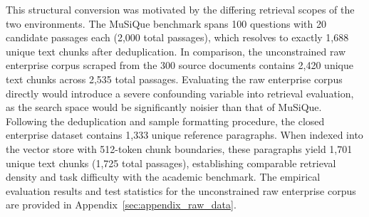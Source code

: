This structural conversion was motivated by the differing retrieval scopes of the two environments. The MuSiQue benchmark spans 100 questions with 20 candidate passages each (2,000 total passages), which resolves to exactly 1,688 unique text chunks after deduplication. In comparison, the unconstrained raw enterprise corpus scraped from the 300 source documents contains 2,420 unique text chunks across 2,535 total passages. Evaluating the raw enterprise corpus directly would introduce a severe confounding variable into retrieval evaluation, as the search space would be significantly noisier than that of MuSiQue. Following the deduplication and sample formatting procedure, the closed enterprise dataset contains 1,333 unique reference paragraphs. When indexed into the vector store with 512-token chunk boundaries, these paragraphs yield 1,701 unique text chunks (1,725 total passages), establishing comparable retrieval density and task difficulty with the academic benchmark. The empirical evaluation results and test statistics for the unconstrained raw enterprise corpus are provided in Appendix~\ref{sec:appendix_raw_data}.
